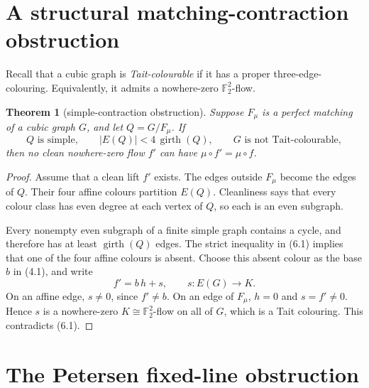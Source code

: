 \documentclass[11pt]{article}
\newtheorem{theorem}{Theorem}[section]
\theoremstyle{definition}
\theoremstyle{remark}
\newcommand{\F}{\mathbb F}
\begin{document}
\section{A structural matching-contraction obstruction}
\label{sec:obstruction}

Recall that a cubic graph is \emph{Tait-colourable} if it has a proper
three-edge-colouring.  Equivalently, it admits a nowhere-zero
\(\F_2^2\)-flow.

\begin{theorem}[simple-contraction obstruction]\label{thm:obstruction}
Suppose \(F_\mu\) is a perfect matching of a cubic graph \(G\), and let
\(Q=G/F_\mu\).  If
\[
 Q\text{ is simple},\qquad
 |E(Q)|<4\,\operatorname{girth}(Q),\qquad
 G\text{ is not Tait-colourable},                       \tag{6.1}
\]
then no clean nowhere-zero flow \(f'\) can have
\(\mu\circ f'=\mu\circ f\).
\end{theorem}

\begin{proof}
Assume that a clean lift \(f'\) exists.  The edges outside \(F_\mu\)
become the edges of \(Q\).  Their four affine colours partition
\(E(Q)\).  Cleanliness says that every colour class has even degree at
each vertex of \(Q\), so each is an even subgraph.

Every nonempty even subgraph of a finite simple graph contains a cycle,
and therefore has at least \(\operatorname{girth}(Q)\) edges.  The strict
inequality in (6.1) implies that one of the four affine colours is absent.
Choose this absent colour as the base \(b\) in (4.1), and write
\[
                         f'=b\,h+s,\qquad s:E(G)\to K.
\]
On an affine edge, \(s\ne0\), since \(f'\ne b\).  On an edge of
\(F_\mu\), \(h=0\) and \(s=f'\ne0\).  Hence \(s\) is a nowhere-zero
\(K\cong\F_2^2\)-flow on all of \(G\), which is a Tait colouring.  This
contradicts (6.1).
\end{proof}

\section{The Petersen fixed-line obstruction}
\label{sec:petersen}
\end{document}
